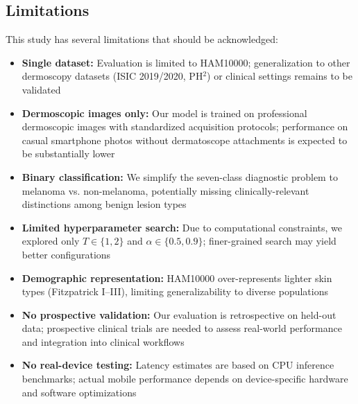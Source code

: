 \documentclass[conference]{IEEEtran}
\begin{document}
\subsection{Limitations}

This study has several limitations that should be acknowledged:

\begin{itemize}
    \item \textbf{Single dataset:} Evaluation is limited to HAM10000; generalization to other dermoscopy datasets (ISIC 2019/2020, PH$^2$) or clinical settings remains to be validated \cite{salinas2024systematic}
    
    \item \textbf{Dermoscopic images only:} Our model is trained on professional dermoscopic images with standardized acquisition protocols; performance on casual smartphone photos without dermatoscope attachments is expected to be substantially lower \cite{papachristou2024evaluation,behara2024ai}
    
    \item \textbf{Binary classification:} We simplify the seven-class diagnostic problem to melanoma vs. non-melanoma, potentially missing clinically-relevant distinctions among benign lesion types
    
    \item \textbf{Limited hyperparameter search:} Due to computational constraints, we explored only $T \in \{1, 2\}$ and $\alpha \in \{0.5, 0.9\}$; finer-grained search may yield better configurations
    
    \item \textbf{Demographic representation:} HAM10000 over-represents lighter skin types (Fitzpatrick I--III), limiting generalizability to diverse populations \cite{behara2024ai,salinas2024systematic}
    
    \item \textbf{No prospective validation:} Our evaluation is retrospective on held-out data; prospective clinical trials are needed to assess real-world performance and integration into clinical workflows \cite{papachristou2024evaluation}
    
    \item \textbf{No real-device testing:} Latency estimates are based on CPU inference benchmarks; actual mobile performance depends on device-specific hardware and software optimizations
\end{itemize}

\end{document}
